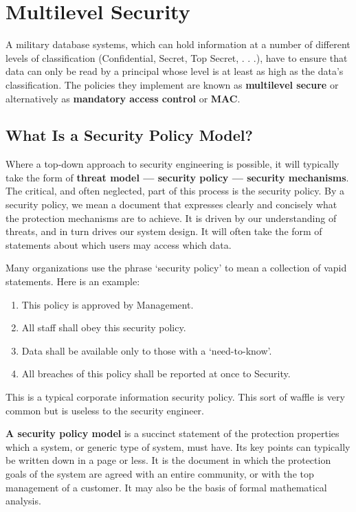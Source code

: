 \chapter{Multilevel Security}

	A military database systems, which can hold information at a number of different levels 
	of classification (Confidential, Secret, Top Secret, . . .), have to ensure that data can 
	only be read by a principal whose level is at least as high as the data’s classification. 
	The policies they implement are known as {\bf multilevel secure} or alternatively as 
	{\bf mandatory access control} or {\bf MAC}.

	\section{What Is a Security Policy Model?}

		Where a top-down approach to security engineering is possible, it will 
		typically take the form of {\bf threat model — security policy — security mechanisms}. 
		The critical, and often neglected, part of this process is the security policy.
		By a security policy, we mean a document that expresses clearly and
		concisely what the protection mechanisms are to achieve. It is driven by our
		understanding of threats, and in turn drives our system design. It will often
		take the form of statements about which users may access which data. 

		Many organizations use the phrase ‘security policy’ to mean a collection of
		vapid statements. Here is an example:

		\begin{enumerate}
			\item This policy is approved by Management.
			\item All staff shall obey this security policy.
			\item Data shall be available only to those with a ‘need-to-know’.
			\item All breaches of this policy shall be reported at once to Security.
		\end{enumerate}

		This is a typical corporate information security policy.
		This sort of waffle is very common but is useless to the security engineer.

		{\bf A security policy model} is a succinct statement of the protection properties
		which a system, or generic type of system, must have. Its key points can
		typically be written down in a page or less. It is the document in which
		the protection goals of the system are agreed with an entire community, or
		with the top management of a customer. It may also be the basis of formal
		mathematical analysis.

